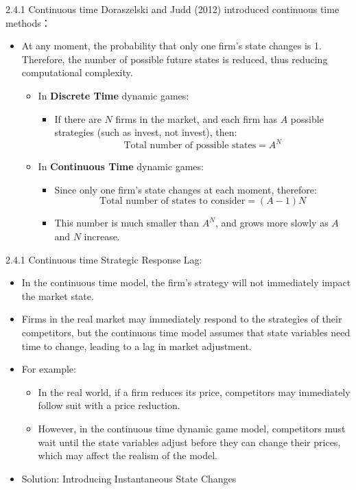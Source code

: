 \documentclass[aspectratio=169]{beamer}  %
\begin{document}
\begin{frame}{2.4.1 Continuous time}
Doraszelski and Judd (2012) introduced continuous time methods：
\begin{itemize}
    \item At any moment, the probability that only one firm's state changes is 1. Therefore, the number of possible future states is reduced, thus reducing computational complexity.

    \begin{itemize}
        \item In \textbf{Discrete Time} dynamic games:
        \begin{itemize}
            \item If there are \( N \) firms in the market, and each firm has \( A \) possible strategies (such as invest, not invest), then:
            \[
            \text{Total number of possible states} = A^{N}
            \]
        \end{itemize}
        \item In \textbf{Continuous Time} dynamic games:
        \begin{itemize}
            \item Since only one firm's state changes at each moment, therefore:
            \[
            \text{Total number of states to consider} = (A - 1)N
            \]
            \item This number is much smaller than \( A^{N} \), and grows more slowly as \( A \) and \( N \) increase.
        \end{itemize}
    \end{itemize}
\end{itemize}
\end{frame}


\begin{frame}
{2.4.1 Continuous time}
Strategic Response Lag:
\begin{itemize}
    \item In the continuous time model, the firm's strategy will not immediately impact the market state.
    \item Firms in the real market may immediately respond to the strategies of their competitors, but the continuous time model assumes that state variables need time to change, leading to a lag in market adjustment.
    \item For example:
    \begin{itemize}
        \item In the real world, if a firm reduces its price, competitors may immediately follow suit with a price reduction.
        \item However, in the continuous time dynamic game model, competitors must wait until the state variables adjust before they can change their prices, which may affect the realism of the model.
    \end{itemize}
    \item Solution: Introducing Instantaneous State Changes
\end{itemize}


\end{frame}
\end{document}
